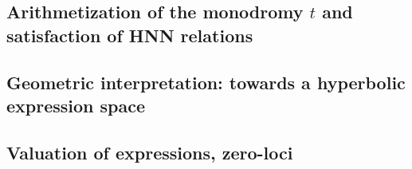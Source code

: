 \subsection{Arithmetization of the monodromy $t$ and satisfaction of HNN relations}
\label{sec:monodromy_hnn_relations}

\subsection{Geometric interpretation: towards a hyperbolic expression space}
\label{sec:hyperbolic_expression_space}

\subsection{Valuation of expressions, zero-loci}
\label{sec:valuation_zeroloci_ideals}


